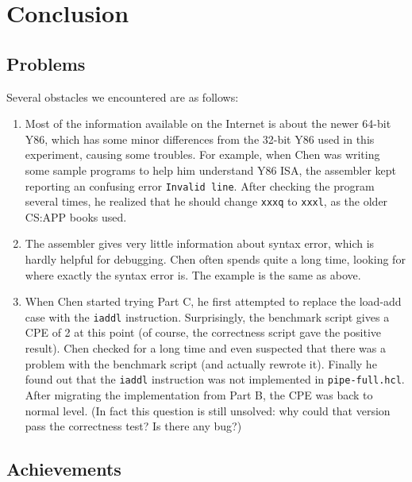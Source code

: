 \documentclass{article}
\begin{document}
\section{Conclusion}

\subsection{Problems}

Several obstacles we encountered are as follows:

\begin{enumerate}
  \item Most of the information available on the Internet is about the newer 64-bit Y86, which has some minor differences from the 32-bit Y86 used in this experiment, causing some troubles. For example, when Chen was writing some sample programs to help him understand Y86 ISA, the assembler kept reporting an confusing error \verb|Invalid line|. After checking the program several times, he realized that he should change \verb|xxxq| to \verb|xxxl|, as the older CS:APP books used.
  \item The assembler gives very little information about syntax error, which is hardly helpful for debugging. Chen often spends quite a long time, looking for where exactly the syntax error is. The example is the same as above.
  \item When Chen started trying Part C, he first attempted to replace the load-add case with the \verb|iaddl| instruction. Surprisingly, the benchmark script gives a CPE of 2 at this point (of course, the correctness script gave the positive result). Chen checked for a long time and even suspected that there was a problem with the benchmark script (and actually rewrote it). Finally he found out that the \verb|iaddl| instruction was not implemented in \verb|pipe-full.hcl|. After migrating the implementation from Part B, the CPE was back to normal level. (In fact this question is still unsolved: why could that version pass the correctness test? Is there any bug?)
\end{enumerate}

\subsection{Achievements}
\end{document}
